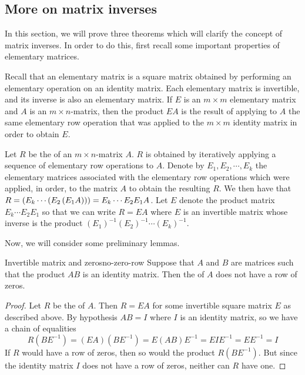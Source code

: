 \subsection{More on matrix inverses}

In this section, we will prove three theorems which will clarify the concept of matrix inverses. In order to do this, first recall some important properties of elementary matrices. 

Recall that an elementary matrix is a square matrix obtained by performing an elementary operation on an identity matrix. Each elementary matrix is invertible, and its inverse is also an elementary matrix. If $E$ is an $m \times m$ elementary matrix and $A$ is an $m \times n$-matrix, then the product $EA$ is the result of applying to $A$ the same elementary row operation that was applied to the $m \times m$ identity matrix in order to obtain $E$.

Let $R$ be the {\rref} of an $m \times n$-matrix $A$. $R$ is obtained by iteratively applying a sequence of elementary row operations to $A$. Denote by $E_1, E_2, \cdots, E_k$ the elementary matrices associated with the elementary row operations which were applied, in order, to the matrix $A$ to obtain the resulting $R$. We then have that $R = \left(E_k \cdots \left(E_2 \left(E_1A \right) \right)\right) = E_k \cdots E_2E_1A$. Let $E$ denote the product matrix $E_k \cdots E_2E_1$ so that we can write $R=EA$ where $E$ is an invertible matrix whose inverse is the product $(E_1)^{-1}(E_2)^{-1} \cdots (E_k)^{-1}$.

Now, we will consider some preliminary lemmas. 

\begin{lemma}{Invertible matrix and zeros}{no-zero-row}
Suppose that $A$ and $B$ are matrices such that the product $AB$ is an identity matrix. Then the {\rref} of $A$ does not have a row of zeros.
\end{lemma}

\begin{proof}
Let $R$ be the {\rref} of $A$. Then $R=EA$ for some invertible square matrix $E$ as described above. By hypothesis $AB=I$ where $I$ is an identity matrix, so we have a chain of equalities
\begin{equation*}
R(BE^{-1})
=
(EA)(BE^{-1})
=
E(AB)E^{-1}
=
EIE^{-1}
=
EE^{-1}
=
I
\end{equation*}
If $R$ would have a row of zeros, then so would the product $R(BE^{-1})$. But since the identity matrix $I$ does not have a row of zeros, neither can $R$ have one.
\end{proof}

